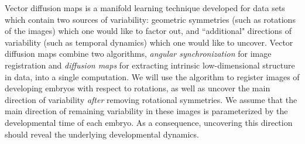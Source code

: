 \documentclass[twocolumn, 10pt]{article}
\makeatletter
\newcommand{\SI}[0]{\textit{SI Materials and Methods}}
\newcommand{\customlabel}[2]{%
\protected@write \@auxout {}{\string \newlabel {#1}{{#2}{}}}}
\makeatother
\begin{document}
Vector diffusion maps \citep{singer2012vector} is a manifold learning
technique developed for data sets which contain two sources of variability:
geometric symmetries (such as rotations of the images) which one would like to factor out,
and ``additional" directions of variability (such as temporal dynamics) which one would like to uncover.
%
Vector diffusion maps combine two algorithms, {\em angular synchronization} \citep{singer2011angular} for image registration and {\em diffusion maps} \citep{coifman2005geometric} for extracting intrinsic low-dimensional structure in data, into a single computation.
%
We will use the algorithm to register images of developing embryos with respect to rotations, as well as uncover the main direction of variability {\it after} removing rotational symmetries.
%
We assume that the main direction of remaining variability in these images is parameterized by the developmental time of each embryo.
%
As a consequence, uncovering this direction should reveal the underlying developmental dynamics.

\end{document}
